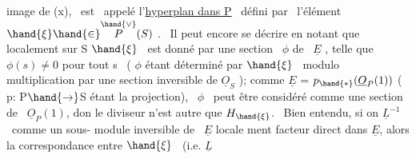 image de (x), \ est \ appelé l'\uline{hyperplan dans P} \ défini par \ l'élément
$\hand{\xi} \hand{\in} \overset{\hand{\vee}}{P}(S)$ . \ Il peut encore se décrire en notant que localement sur S 
 \quad $\hand{\xi}$ \ est donné par une section \ $\phi$ de \ $\underline{E}$ ,  telle
 que $\phi(s) \neq 0$ pour tout s \ ( $\phi$ étant déterminé par $\hand{\xi}$ \ modulo
multiplication par une section inversible de $\underline{O}_S$ ); comme $\underline{E}$ = $p_{\hand{*}}(\underline{O}_P(1))$
( p: P$\hand{\to}$S étant la projection), \ $\phi$ \ peut être considéré comme une section
de \ $\underline{O}_P(1)$, don le diviseur n'est autre que $H_{\hand{\xi}}$. \ Bien entendu, si on
 $\underline{L}^{-1}$ \ comme un sous- module inversible de \ $\underline{E}$ locale
ment facteur direct dans $\underline{E}$, alors la correspondance entre $\hand{\xi}$ \ (i.e. $\underline{L}$ \hand{\unsure{$\xi$,}}

